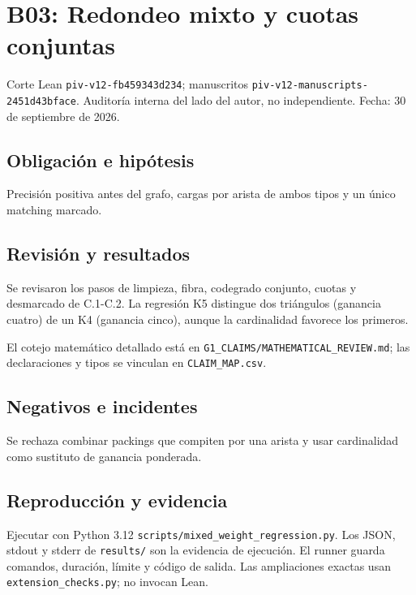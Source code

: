 \section{B03: Redondeo mixto y cuotas
conjuntas}\label{b03-redondeo-mixto-y-cuotas-conjuntas}

Corte Lean \texttt{piv-v12-fb459343d234}; manuscritos
\texttt{piv-v12-manuscripts-2451d43bface}. Auditoría interna del lado
del autor, no independiente. Fecha: 30 de septiembre de 2026.

\subsection{Obligación e hipótesis}\label{obligaciuxf3n-e-hipuxf3tesis}

Precisión positiva antes del grafo, cargas por arista de ambos tipos y
un único matching marcado.

\subsection{Revisión y resultados}\label{revisiuxf3n-y-resultados}

Se revisaron los pasos de limpieza, fibra, codegrado conjunto, cuotas y
desmarcado de C.1-C.2. La regresión K5 distingue dos triángulos
(ganancia cuatro) de un K4 (ganancia cinco), aunque la cardinalidad
favorece los primeros.

El cotejo matemático detallado está en
\texttt{G1\_CLAIMS/MATHEMATICAL\_REVIEW.md}; las declaraciones y tipos
se vinculan en \texttt{CLAIM\_MAP.csv}.

\subsection{Negativos e incidentes}\label{negativos-e-incidentes}

Se rechaza combinar packings que compiten por una arista y usar
cardinalidad como sustituto de ganancia ponderada.

\subsection{Reproducción y evidencia}\label{reproducciuxf3n-y-evidencia}

Ejecutar con Python 3.12 \texttt{scripts/mixed\_weight\_regression.py}.
Los JSON, stdout y stderr de \texttt{results/} son la evidencia de
ejecución. El runner guarda comandos, duración, límite y código de
salida. Las ampliaciones exactas usan \texttt{extension\_checks.py}; no
invocan Lean.

